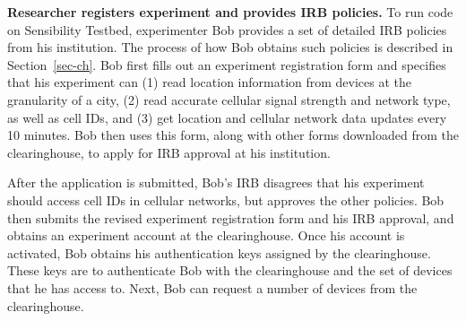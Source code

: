 \textbf{Researcher registers experiment and provides IRB policies.}
To run code on Sensibility Testbed, experimenter Bob provides a
set of detailed IRB policies from his institution. The process of how
Bob obtains such policies is described in Section~\ref{sec-ch}.
Bob first fills out an experiment registration form and specifies that 
his experiment can (1) read location information
from devices at the granularity of a city, (2) read accurate
cellular signal strength and network type, as well as
cell IDs, and (3) get location and
cellular network data updates every 10 minutes. 
Bob then uses this form, along with other forms downloaded 
from the clearinghouse, to apply for IRB approval at his institution.

After the application is submitted, Bob's IRB disagrees that his 
experiment should access cell IDs in cellular networks, but approves 
the other policies. Bob then submits the revised experiment registration form
and his IRB approval, and obtains an experiment account at the
clearinghouse. Once his account is activated, Bob obtains his 
authentication keys assigned by the 
clearinghouse. These keys are to authenticate Bob with the 
clearinghouse and the set of devices that he has access to.
Next, Bob can request a number of devices from the clearinghouse.

